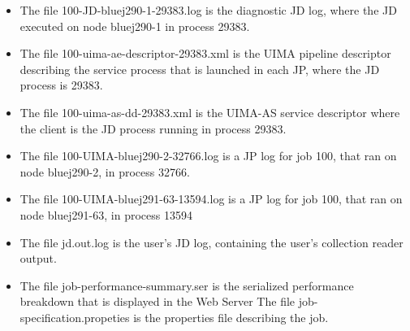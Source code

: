 \begin{itemize}
     \item[] The file 100-JD-bluej290-1-29383.log is the diagnostic JD log, where the JD executed on node
       bluej290-1 in process 29383.

     \item[] The file 100-uima-ae-descriptor-29383.xml is the UIMA pipeline descriptor describing the
       service process that is launched in each JP, where the JD process is 29383.

     \item[] The file 100-uima-as-dd-29383.xml is the UIMA-AS service descriptor where the client is
       the JD process running in process 29383.

     \item[] The file 100-UIMA-bluej290-2-32766.log is a JP log for job 100, that ran on node
       bluej290-2, in process 32766.

     \item[] The file 100-UIMA-bluej291-63-13594.log is a JP log for job 100, that ran on node
       bluej291-63, in process 13594

     \item[] The file jd.out.log is the user's JD log, containing the user's collection reader output.

     \item[] The file job-performance-summary.ser is the serialized performance breakdown that is
       displayed in the Web Server The file job-specification.propeties is the properties file
       describing the job.
\end{itemize}
     
